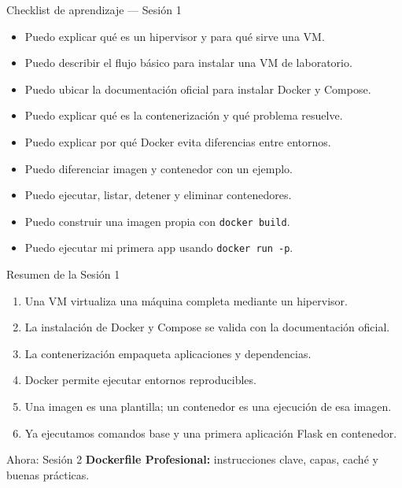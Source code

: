\documentclass[aspectratio=169]{beamer}
\begin{document}
\begin{frame}{Checklist de aprendizaje — Sesión 1}
  \begin{itemize}
    \item Puedo explicar qué es un hipervisor y para qué sirve una VM.
    \item Puedo describir el flujo básico para instalar una VM de laboratorio.
    \item Puedo ubicar la documentación oficial para instalar Docker y Compose.
    \item Puedo explicar qué es la contenerización y qué problema resuelve.
    \item Puedo explicar por qué Docker evita diferencias entre entornos.
    \item Puedo diferenciar imagen y contenedor con un ejemplo.
    \item Puedo ejecutar, listar, detener y eliminar contenedores.
    \item Puedo construir una imagen propia con \texttt{docker build}.
    \item Puedo ejecutar mi primera app usando \texttt{docker run -p}.
  \end{itemize}
\end{frame}


\begin{frame}{Resumen de la Sesión 1}
  \footnotesize
  \begin{enumerate}
    \item Una VM virtualiza una máquina completa mediante un hipervisor.
    \item La instalación de Docker y Compose se valida con la documentación oficial.
    \item La contenerización empaqueta aplicaciones y dependencias.
    \item Docker permite ejecutar entornos reproducibles.
    \item Una imagen es una plantilla; un contenedor es una ejecución de esa imagen.
    \item Ya ejecutamos comandos base y una primera aplicación Flask en contenedor.
  \end{enumerate}
  \vspace{0.08cm}
  \begin{alertblock}{Ahora: Sesión 2}
    \textbf{Dockerfile Profesional:} instrucciones clave, capas, caché y buenas prácticas.
  \end{alertblock}
\end{frame}
\end{document}

